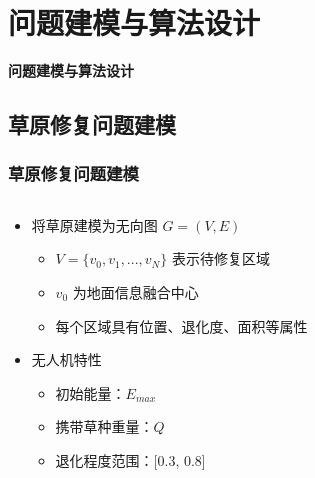 \documentclass[11pt, aspectratio=169]{beamer}  %
\begin{document}
\section{问题建模与算法设计}
\begin{frame}
	\centering %
	{\Huge \sffamily\bfseries\textcolor{njupt}{问题建模与算法设计}}
	\par %
	\vspace{0.5cm} %
\end{frame}

\subsection{草原修复问题建模}
\begin{frame}
	\frametitle{草原修复问题建模}
	\begin{columns}
		\begin{column}{0.4\textwidth}
			\small %
			\begin{itemize}
				\item 将草原建模为无向图 $G = (V, E)$
				      \begin{itemize}
					      \item $V = \{v_0, v_1, ..., v_N \}$ 表示待修复区域
					      \item $v_0$ 为地面信息融合中心
					      \item 每个区域具有位置、退化度、面积等属性
				      \end{itemize}
				\item 无人机特性
				      \begin{itemize}
					      \item 初始能量：$E_{max}$
					      \item 携带草种重量：$Q$
					      \item 退化程度范围：[0.3, 0.8]
				      \end{itemize}
			\end{itemize}
		\end{column}
		\begin{column}{0.6\textwidth}
			\centering
			
		\end{column}
	\end{columns}
\end{frame}
\end{document}
